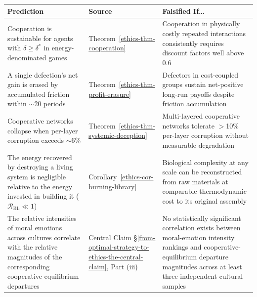 \documentclass[11pt]{article}
\theoremstyle{plain}
\theoremstyle{definition}
\theoremstyle{remark}
\newcounter{none}
\begin{document}
{\def\LTcaptype{none} %
\begin{longtable}[]{@{}
  >{\raggedright\arraybackslash}p{}
  >{\raggedright\arraybackslash}p{}
  >{\raggedright\arraybackslash}p{}@{}}
\toprule\noalign{}
\begin{minipage}[b]{\linewidth}\raggedright
Prediction
\end{minipage} & \begin{minipage}[b]{\linewidth}\raggedright
Source
\end{minipage} & \begin{minipage}[b]{\linewidth}\raggedright
Falsified If\ldots{}
\end{minipage} \\
\midrule\noalign{}
\endhead
\bottomrule\noalign{}
\endlastfoot
Cooperation is sustainable for agents with \(\delta \geq \delta^*\) in
energy-denominated games & Theorem~\ref{ethics-thm-cooperation} &
Cooperation in physically costly repeated interactions consistently
requires discount factors well above 0.6 \\
A single defection's net gain is erased by accumulated friction within
$\sim$20 periods & Theorem~\ref{ethics-thm-profit-erasure} & Defectors
in cost-coupled groups sustain net-positive long-run payoffs despite
friction accumulation \\
Cooperative networks collapse when per-layer corruption exceeds
$\sim$6\% & Theorem~\ref{ethics-thm-systemic-deception} & Multi-layered
cooperative networks tolerate $>$10\% per-layer corruption without
measurable degradation \\
The energy recovered by destroying a living system is negligible
relative to the energy invested in building it
(\(\mathcal{R}_{\text{BL}} \ll 1\)) &
Corollary~\ref{ethics-cor-burning-library} & Biological complexity at
any scale can be reconstructed from raw materials at comparable
thermodynamic cost to its original assembly \\
The relative intensities of moral emotions across cultures correlate
with the relative magnitudes of the corresponding
cooperative-equilibrium departures & Central Claim
§\ref{from-optimal-strategy-to-ethics-the-central-claim}, Part (iii) &
No statistically significant correlation exists between moral-emotion
intensity rankings and cooperative-equilibrium departure magnitudes
across at least three independent cultural samples \\
\end{longtable}
}
\end{document}
